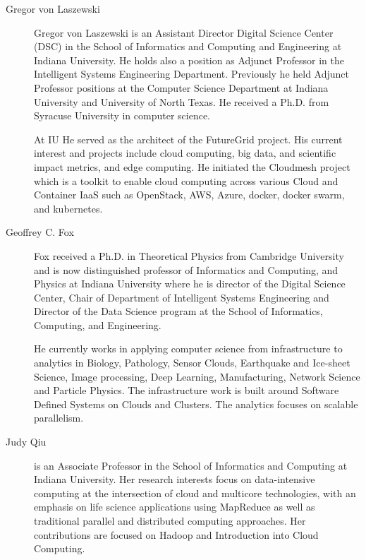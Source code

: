 \begin{description}

\item[Gregor von Laszewski] Gregor von
  Laszewski is an Assistant Director Digital Science Center (DSC) in the School of Informatics
  and Computing and Engineering at Indiana University. He holds also a
  position as Adjunct Professor in the Intelligent Systems Engineering
  Department. Previously he held Adjunct Professor positions at the
  Computer Science Department at Indiana University and University of
  North Texas. He received a Ph.D. from Syracuse University in
  computer science.

  At IU He served as the architect of the FutureGrid project. His
  current interest and projects include cloud computing, big data, and
  scientific impact metrics, and edge computing.  He initiated the
  Cloudmesh project which is a toolkit to enable cloud computing
  across various Cloud and Container IaaS such as OpenStack, AWS,
  Azure, docker, docker swarm, and kubernetes.


\item[Geoffrey C. Fox] Fox received a Ph.D. in
  Theoretical Physics from Cambridge University and is now
  distinguished professor of Informatics and Computing, and Physics at
  Indiana University where he is director of the Digital Science
  Center, Chair of Department of Intelligent Systems Engineering and
  Director of the Data Science program at the School of Informatics,
  Computing, and Engineering.

  He currently works in applying computer science from infrastructure
  to analytics in Biology, Pathology, Sensor Clouds, Earthquake and
  Ice-sheet Science, Image processing, Deep Learning, Manufacturing,
  Network Science and Particle Physics. The infrastructure work is
  built around Software Defined Systems on Clouds and Clusters. The
  analytics focuses on scalable parallelism.

\item [Judy Qiu] is an Associate Professor in the School of
  Informatics and Computing at Indiana University. Her research
  interests focus on data-intensive computing at the intersection of
  cloud and multicore technologies, with an emphasis on life science
  applications using MapReduce as well as traditional parallel and
  distributed computing approaches. Her contributions are focused on
  Hadoop and Introduction into Cloud Computing. 

\end{description}


